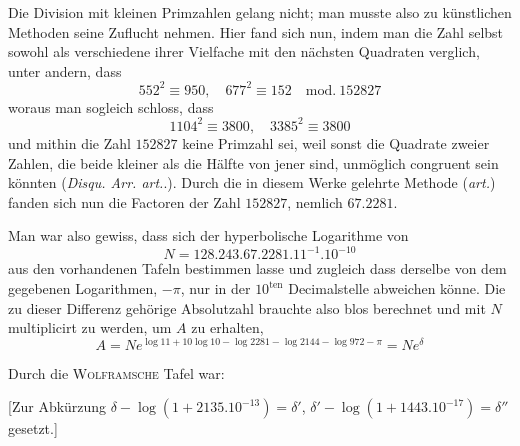 Die Division mit kleinen Primzahlen gelang nicht; man musste also zu
künstlichen Methoden seine Zuflucht nehmen. Hier fand sich nun, indem man
die Zahl selbst sowohl als verschiedene ihrer Vielfache mit den nächsten Quadraten
verglich, unter andern, dass
\[
552^2\equiv950,\quad677^2\equiv152\quad\mathrm{mod.}\ 152827
\]
woraus man sogleich schloss, dass
\[
1104^2\equiv3800,\quad3385^2\equiv3800
\]
und mithin die Zahl $152827$ keine Primzahl sei, weil sonst die Quadrate zweier
Zahlen, die beide kleiner als die Hälfte von jener sind, unmöglich congruent
sein könnten (\textit{Disqu. Arr. art.}\quad.). Durch die in diesem Werke gelehrte Methode
(\textit{art.}\quad) fanden sich nun die Factoren der Zahl $152827$, nemlich $67.2281$.

Man war also gewiss, dass sich der hyperbolische Logarithme von
\[
N=128.243.67.2281.11^{-1}.10^{-10}
\]
aus den vorhandenen Tafeln bestimmen lasse und zugleich dass derselbe von dem
gegebenen Logarithmen, $-\pi$, nur in der $10^{\mathrm{ten}}$ Decimalstelle abweichen könne.
Die zu dieser Differenz gehörige Absolutzahl brauchte also blos berechnet und
mit $N$ multiplicirt zu werden, um $A$ zu erhalten,
\[
A=Ne^{\log11+10\log10-\log2281-\log2144-\log972-\pi}=Ne^\delta
\]


Durch die \textsc{Wolframsche} Tafel war:

[Zur Abkürzung $\delta-\log(1+2135.10^{-13})=\delta'$,
$\delta'-\log(1+1443.10^{-17})=\delta''$ gesetzt.]

